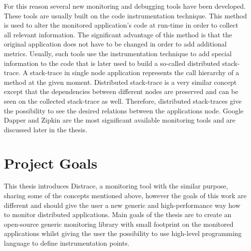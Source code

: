 For this reason several new monitoring and debugging tools have been developed. These tools are usually built on the code instrumentation technique. This method is used to alter the monitored application's code at run-time in order to collect all relevant information. The significant advantage of this method is that the original application does not have to be changed in order to add additional metrics. Usually, such tools use the instrumentation technique to add special information to the code that is later used to build a so-called distributed stack-trace.  A stack-trace in single node application represents the call hierarchy of a method at the given moment. Distributed stack-trace is a very similar concept except that the dependencies between different nodes are preserved and can be seen on the collected stack-trace as well. Therefore, distributed stack-traces give the possibility to see the desired relations between the applications node. Google Dapper and Zipkin are the most significant available monitoring tools and are discussed later in the thesis. 


\section{Project Goals}
This thesis introduces Distrace, a monitoring tool with the similar purpose, sharing some of the concepts mentioned above, however the goals of this work are different and should give the user a new generic and high-performance way how to monitor distributed applications. Main goals of the thesis are to create an open-source generic monitoring library with small footprint on the monitored applications whilst giving the user the possibility to use high-level programming language to define instrumentation points.

